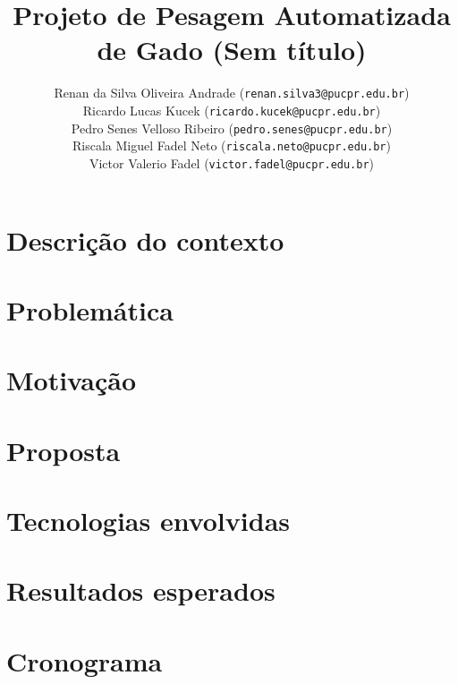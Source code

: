 \documentclass[11pt]{article}
\title{\textbf{Projeto de Pesagem Automatizada de Gado (Sem título)}}
\author{Renan da Silva Oliveira Andrade (\texttt{renan.silva3@pucpr.edu.br})\\ Ricardo Lucas Kucek (\texttt{ricardo.kucek@pucpr.edu.br})\\ Pedro Senes Velloso Ribeiro (\texttt{pedro.senes@pucpr.edu.br})\\ Riscala Miguel Fadel Neto (\texttt{riscala.neto@pucpr.edu.br})\\ Victor Valerio Fadel (\texttt{victor.fadel@pucpr.edu.br})}
\begin{document}
\maketitle

\section{Descrição do contexto}
\section{Problemática}
\section{Motivação}
\section{Proposta}
\section{Tecnologias envolvidas}
\section{Resultados esperados}
\section{Cronograma}



\end{document}
